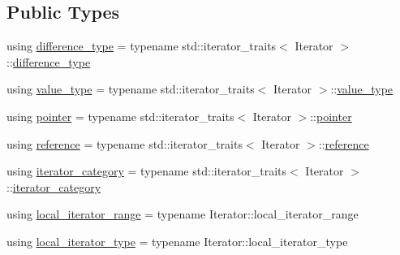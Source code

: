 \subsection*{Public Types}
\begin{DoxyCompactItemize}
\item 
using \hyperlink{structshad_1_1distributed__iterator__traits_ad4f676acbe7b835cfda9f2ba84de0617}{difference\-\_\-type} = typename std\-::iterator\-\_\-traits$<$ Iterator $>$\-::\hyperlink{structshad_1_1distributed__iterator__traits_ad4f676acbe7b835cfda9f2ba84de0617}{difference\-\_\-type}
\item 
using \hyperlink{structshad_1_1distributed__iterator__traits_a67d1c97f6cfbb30068ed30d5fd5ef2bc}{value\-\_\-type} = typename std\-::iterator\-\_\-traits$<$ Iterator $>$\-::\hyperlink{structshad_1_1distributed__iterator__traits_a67d1c97f6cfbb30068ed30d5fd5ef2bc}{value\-\_\-type}
\item 
using \hyperlink{structshad_1_1distributed__iterator__traits_a3a4ebe1206d3e4d866752f2a3080f699}{pointer} = typename std\-::iterator\-\_\-traits$<$ Iterator $>$\-::\hyperlink{structshad_1_1distributed__iterator__traits_a3a4ebe1206d3e4d866752f2a3080f699}{pointer}
\item 
using \hyperlink{structshad_1_1distributed__iterator__traits_a82276f0370374d079f192c503f21b7a5}{reference} = typename std\-::iterator\-\_\-traits$<$ Iterator $>$\-::\hyperlink{structshad_1_1distributed__iterator__traits_a82276f0370374d079f192c503f21b7a5}{reference}
\item 
using \hyperlink{structshad_1_1distributed__iterator__traits_ae2c93d2849540657dd1f56c643d75c26}{iterator\-\_\-category} = typename std\-::iterator\-\_\-traits$<$ Iterator $>$\-::\hyperlink{structshad_1_1distributed__iterator__traits_ae2c93d2849540657dd1f56c643d75c26}{iterator\-\_\-category}
\item 
using \hyperlink{structshad_1_1distributed__iterator__traits_a7d2783595fdcaa86693980e101ce3c45}{local\-\_\-iterator\-\_\-range} = typename Iterator\-::local\-\_\-iterator\-\_\-range
\item 
using \hyperlink{structshad_1_1distributed__iterator__traits_afc228b2fcc17374bae1db42f3f666ac8}{local\-\_\-iterator\-\_\-type} = typename Iterator\-::local\-\_\-iterator\-\_\-type
\end{DoxyCompactItemize}
